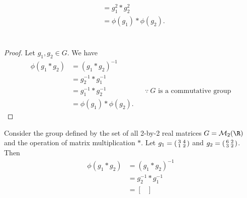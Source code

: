 \documentclass[
  coursecode={MTHE 418},
  assignmentname={Homework \homeworknumber},
  studentnumber=20053722,
  name={Bryan Hoang},
  draft,
]{
  ltxanswer%
}
\begin{document}
\begin{questions}
\begin{parts}
\begin{solution}
\begin{example}
\begin{align*}
                                &= g_{1}^{2} * g_{2}^{2}                                                                                                                                                                                 \\
                                &= \phi(g_{1}) * \phi(g_{2}).
          \end{align*}
        \end{example}
      \end{solution}

      \part{}
      \begin{solution}
        \begin{proof}
          Let \(g_{1}, g_{2} \in G\). We have
          \begin{align*}
            \phi(g_{1} * g_{2}) &= (g_{1} * g_{2})^{-1}                                                        \\
                                &= g_{2}^{-1} * g_{1}^{-1}                                                     \\
                                &= g_{1}^{-1} * g_{2}^{-1}    & &\because\ \text{\(G\) is a commutative group} \\
                                &= \phi(g_{1}) * \phi(g_{2}).
          \end{align*}
        \end{proof}
        \begin{example}
          Consider the group defined by the set of all 2-by-2 real matrices \(G = \mathcal{M}_{2}(\R)\) and the operation of matrix multiplication \(*\). Let \(g_{1} = \begin{psmallmatrix}3 & 4\\1 & 2\end{psmallmatrix}\) and \(g_{2} = \begin{psmallmatrix}6 & 2\\3 & 2\end{psmallmatrix}\). Then
          \begin{align*}
            \phi(g_{1} * g_{2}) &= (g_{1} * g_{2})^{-1}                    \\
                                &= g_{2}^{-1} * g_{1}^{-1}                 \\
                                &= \begin{bmatrix}

\end{bmatrix}
\end{align*}
\end{example}
\end{solution}
\end{parts}
\end{questions}
\end{document}
